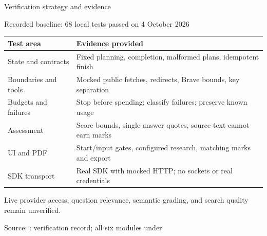 \documentclass[aspectratio=169,11pt]{beamer}
\newcommand{\code}[1]{\texttt{\detokenize{#1}}}
\newcommand{\source}[1]{\par\vfill{\raggedright\fontsize{7}{8.5}\selectfont\color{Slate}Source: #1\par}}
\newcommand{\lead}[1]{{\large\color{Teal}#1\par}\vspace{3mm}}
\newcommand{\gap}{\vspace{3mm}}
\begin{document}
\begin{frame}[t]{Verification strategy and evidence}
  \lead{Recorded baseline: 68 local tests passed on 4 October 2026}
  \small\renewcommand{\arraystretch}{1.2}
  \begin{tabularx}{\textwidth}{L{3.1cm}Y}
    \toprule
    \textbf{Test area} & \textbf{Evidence provided}\\
    \midrule
    State and contracts & Fixed planning, completion, malformed plans, idempotent finish\\
    Boundaries and tools & Mocked public fetches, redirects, Brave bounds, key separation\\
    Budgets and failures & Stop before spending; classify failures; preserve known usage\\
    Assessment & Score bounds, single-answer quotes, source text cannot earn marks\\
    UI and PDF & Start/input gates, configured research, matching marks and export\\
    SDK transport & Real SDK with mocked HTTP; no sockets or real credentials\\
    \bottomrule
  \end{tabularx}\par
  \gap
  Live provider access, question relevance, semantic grading, and search quality remain unverified.
  \source{\code{README.md}: verification record; all six modules under \code{tests/}}
\end{frame}
\end{document}
